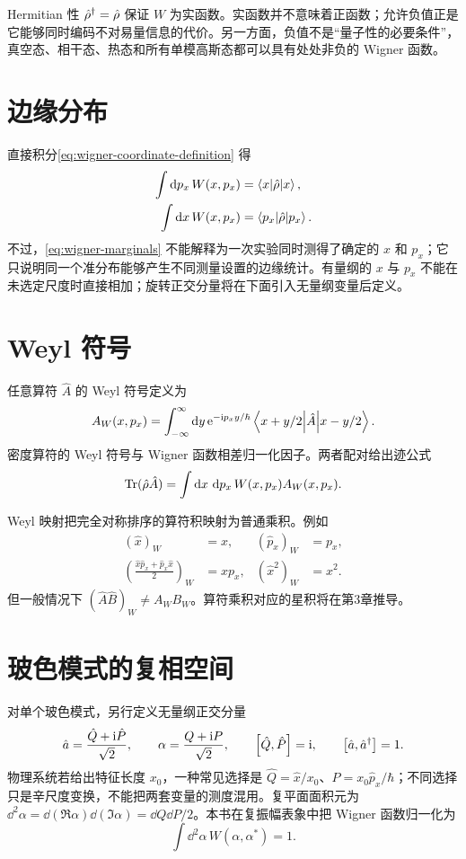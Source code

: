 Hermitian 性 $\hat\rho^\dagger=\hat\rho$ 保证 $W$ 为实函数。实函数并不意味着正函数；允许负值正是它能够同时编码不对易量信息的代价。另一方面，负值不是“量子性的必要条件”，真空态、相干态、热态和所有单模高斯态都可以具有处处非负的 Wigner 函数。

\section{边缘分布}

直接积分\cref{eq:wigner-coordinate-definition} 得
\begin{align}
  \int\mathop{}\!\mathrm{d} p_x\,W(x,p_x)&=\left\langle x\middle\vert \hat\rho\middle\vert x\right\rangle,\\
  \int\mathop{}\!\mathrm{d} x\,W(x,p_x)&=\left\langle p_x\middle\vert \hat\rho\middle\vert p_x\right\rangle.
  \label{eq:wigner-marginals}
\end{align}
不过，\cref{eq:wigner-marginals} 不能解释为一次实验同时测得了确定的 $x$ 和 $p_x$；它只说明同一个准分布能够产生不同测量设置的边缘统计。有量纲的 $x$ 与 $p_x$ 不能在未选定尺度时直接相加；旋转正交分量将在下面引入无量纲变量后定义。

\section{Weyl 符号}

任意算符 $\hat A$ 的 Weyl 符号定义为
\begin{equation}
  A_W(x,p_x)=\int_{-\infty}^{\infty}\mathop{}\!\mathrm{d} y\,
  \mathrm{e}^{-\mathrm{i} p_x y/\hbar}
  \left\langle x+y/2\middle\vert \hat A\middle\vert x-y/2\right\rangle.
  \label{eq:weyl-symbol-definition}
\end{equation}
密度算符的 Weyl 符号与 Wigner 函数相差归一化因子。两者配对给出迹公式
\begin{equation}
  \operatorname{Tr}(\hat\rho\hat A)
  =\int\mathop{}\!\mathrm{d} x\,\mathop{}\!\mathrm{d} p_x\,W(x,p_x)A_W(x,p_x).
  \label{eq:weyl-trace-rule}
\end{equation}

Weyl 映射把完全对称排序的算符积映射为普通乘积。例如
\begin{align}
  (\hat x)_W&=x, & (\hat p_x)_W&=p_x,\\
  \left(\frac{\hat x\hat p_x+\hat p_x\hat x}{2}\right)_W&=xp_x,
  & (\hat x^2)_W&=x^2.
\end{align}
但一般情况下 $(\hat A\hat B)_W\neq A_WB_W$。算符乘积对应的星积将在第3章推导。

\section{玻色模式的复相空间}

对单个玻色模式，另行定义无量纲正交分量
\begin{equation}
  \hat a=\frac{\hat Q+\mathrm{i}\hat P}{\sqrt{2}},
  \qquad
  \alpha=\frac{Q+\mathrm{i} P}{\sqrt{2}},
  \qquad \left[\hat Q,\hat P\right]=\mathrm{i},
  \qquad \left[\hat a,\hat a^{\dagger}\right]=1.
  \label{eq:mode-quadratures}
\end{equation}
物理系统若给出特征长度 $x_0$，一种常见选择是 $\hat Q=\hat x/x_0$、$\hat P=x_0\hat p_x/\hbar$；不同选择只是辛尺度变换，不能把两套变量的测度混用。复平面面积元为 $\dd^2\alpha=\dd(\Re\alpha)\dd(\Im\alpha)=\dd Q\dd P/2$。本书在复振幅表象中把 Wigner 函数归一化为
\begin{equation}
  \int\dd^2\alpha\,W(\alpha,\alpha^*)=1.
\end{equation}

